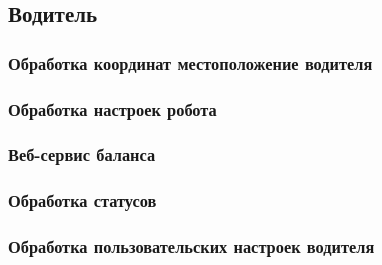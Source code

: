 \subsection{Водитель}


	\subsubsection{Обработка координат местоположение водителя}

	\subsubsection{Обработка настроек робота}

	\subsubsection{Веб-сервис баланса}

	\subsubsection{Обработка статусов}

	\subsubsection{Обработка пользовательских настроек водителя} \label{server_driver_user_settings}
